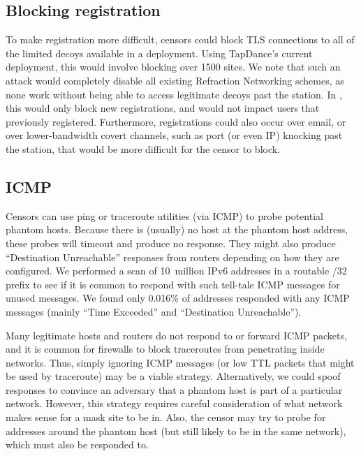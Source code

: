 \documentclass[sigconf,anonymous]{acmart}
\begin{document}
\subsection{Blocking registration}
To make registration more difficult, censors could block TLS connections to all of the
limited decoys available in a deployment. Using TapDance's current deployment,
this would involve blocking over 1500 sites. We note that such an attack would
completely disable all existing Refraction Networking schemes, as none work
without being able to access legitimate decoys past the station. In \scheme,
this would only block new registrations, and would not impact users that
previously registered. Furthermore, registrations could also occur over email,
or over lower-bandwidth covert channels, such as port (or even IP) knocking past
the station, that would be more difficult for the censor to block.



\subsection{ICMP}
Censors can use ping or traceroute utilities (via ICMP) to probe potential phantom
hosts. Because there is (usually) no host at the phantom host address, these
probes will timeout and produce no response. They might also produce
``Destination Unreachable'' responses from routers depending on how they are
configured. We performed a scan of 10~million IPv6 addresses in a routable /32
prefix to see if it is common to respond with such tell-tale ICMP messages for
unused messages. We found only 0.016\% of addresses responded with any ICMP
messages (mainly ``Time Exceeded'' and ``Destination Unreachable'').

Many legitimate hosts and routers do not respond to or forward ICMP packets, and
it is common for firewalls to block traceroutes from penetrating inside
networks. Thus, simply ignoring ICMP messages (or low TTL packets that might be
used by traceroute) may be a viable strategy. %
Alternatively, we could spoof responses to convince an adversary that a 
phantom host is part of a particular network. However, this strategy requires careful
consideration of what network makes sense for a mask site to be in. Also, the
censor may try to probe for addresses around the phantom host (but still likely to
be in the same network), which must also be responded to.
\end{document}
